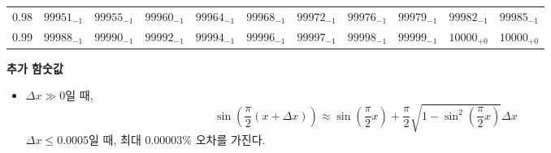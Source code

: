 \documentclass[10pt, a4paper]{article}
\begin{document}
\begin{center}
\begin{longtable}{c || c c c c c | c c c c c}
        0.98 & \({99951}_{-1}\) & \({99955}_{-1}\) & \({99960}_{-1}\) & \({99964}_{-1}\) & \({99968}_{-1}\) & \({99972}_{-1}\) & \({99976}_{-1}\) & \({99979}_{-1}\) & \({99982}_{-1}\) & \({99985}_{-1}\)\\
        0.99 & \({99988}_{-1}\) & \({99990}_{-1}\) & \({99992}_{-1}\) & \({99994}_{-1}\) & \({99996}_{-1}\) & \({99997}_{-1}\) & \({99998}_{-1}\) & \({99999}_{-1}\) & \({10000}_{+0}\) & \({10000}_{+0}\)\\
        \hline
    \end{longtable}
    \textbf{추가 함숫값}
    \begin{itemize}
        \item \(\Delta x \gg 0\)일 때, 
        \[\sin\left(\frac{\pi}{2}\left(x+\Delta x\right)\right) \approx 
        \sin{\left(\frac{\pi}{2}x\right)} + \frac{\pi}{2}\sqrt{1-\sin^{2}\left(\frac{\pi}{2}x\right)}\Delta x\]
        \(\Delta x \leq 0.0005\)일 때, 최대 \(0.00003\)\% 오차를 가진다. 
    \end{itemize}
\end{center}
\pagebreak
\end{document}
